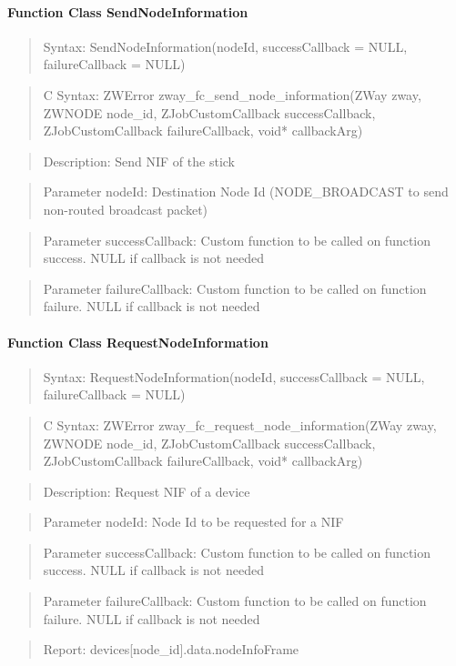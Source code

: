 \paragraph{Function Class SendNodeInformation}
\begin{quote}Syntax: SendNodeInformation(nodeId, successCallback = NULL, failureCallback = NULL)\end{quote}
\begin{quote}C Syntax: ZWError zway\_fc\_send\_node\_information(ZWay zway, ZWNODE node\_id, ZJobCustomCallback successCallback, ZJobCustomCallback failureCallback, void* callbackArg)\end{quote}
\begin{quote}Description: Send NIF of the stick\end{quote}
\begin{quote}Parameter nodeId: Destination Node Id (NODE\_BROADCAST to send non-routed broadcast packet)\end{quote}
\begin{quote}Parameter successCallback: Custom function to be called on function success. NULL if callback is not needed\end{quote}
\begin{quote}Parameter failureCallback: Custom function to be called on function failure. NULL if callback is not needed\end{quote}


\paragraph{Function Class RequestNodeInformation}
\begin{quote}Syntax: RequestNodeInformation(nodeId, successCallback = NULL, failureCallback = NULL)\end{quote}
\begin{quote}C Syntax: ZWError zway\_fc\_request\_node\_information(ZWay zway, ZWNODE node\_id, ZJobCustomCallback successCallback, ZJobCustomCallback failureCallback, void* callbackArg)\end{quote}
\begin{quote}Description: Request NIF of a device\end{quote}
\begin{quote}Parameter nodeId: Node Id to be requested for a NIF\end{quote}
\begin{quote}Parameter successCallback: Custom function to be called on function success. NULL if callback is not needed\end{quote}
\begin{quote}Parameter failureCallback: Custom function to be called on function failure. NULL if callback is not needed\end{quote}
\begin{quote}Report: devices[node\_id].data.nodeInfoFrame\end{quote}

